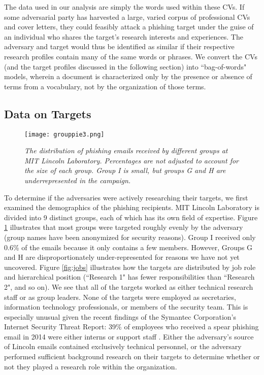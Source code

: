 \documentclass[conference]{IEEEtran}
\begin{document}
The data used in our analysis are simply the words used within these CVs.  If some adversarial party has harvested a large, varied corpus of professional CVs and cover letters, they could feasibly attack a phishing 
target under the guise of an individual who shares the target's research interests and experiences.  The adversary and target would thus be identified as similar if their respective research profiles contain many of the same words or phrases.  We convert the CVs (and the target profiles discussed in the following section) into ``bag-of-words" models, wherein a document is characterized only by the 
presence or absence of terms from a vocabulary, not by the organization of those terms.

\subsection{Data on Targets}
\begin{figure}[b!]
\begin{center}
\texttt{[image: grouppie3.png]}
\caption{\sl The distribution of phishing emails received by different groups at MIT Lincoln Laboratory.  Percentages are not adjusted to account for the size of each group.  Group I is small, but groups G and H 
are underrepresented in the campaign.\label{fig:pie}}
\end{center}
\end{figure}
To determine if the adversaries were actively researching their targets, we first examined the demographics of the phishing recipients.  MIT Lincoln Laboratory is divided into 9 distinct groups, each of 
which has its own field of expertise.  Figure \ref{fig:pie} illustrates that most groups were targeted roughly evenly by the adversary (group names have been anonymized for security reasons).  
Group I received only 0.6\% of the emails because it only contains a few members.  However, Groups G and H are disproportionately under-represented for reasons we have not yet uncovered.  Figure 
\ref{fig:jobs} illustrates how the targets are distributed by job role and hierarchical position (``Research 1" has fewer responsibilities than ``Research 2", 
and so on).  
We see that all of the targets worked as either technical research staff or as group leaders.  None of the targets were employed as secretaries, 
information technology professionals, or members of the security team.  This is especially unusual given the recent findings of the Symantec Corporation's  
Internet Security Threat Report: 39\% of employees who received a spear phishing email in 2014 were either interns 
or support staff \cite{symantec}.  Either the adversary's source of Lincoln emails contained exclusively technical personnel, or the adversary performed 
sufficient background research on their targets to determine whether or not they played a research role within the organization.
\end{document}
